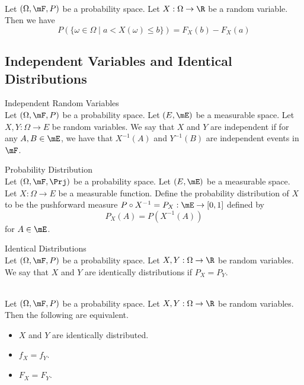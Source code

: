 \documentclass[a4paper]{article}
\begin{document}
\begin{prp}{}{}\\
Let $(\Omega,\mF,P)$ be a probability space. Let $X:\Omega\to\R$ be a random variable. Then we have $$P(\{\omega\in\Omega\;|\;a<X(\omega)\leq b\})=F_X(b)-F_X(a)$$
\end{prp}

\subsection{Independent Variables and Identical Distributions}
\begin{defn}{Independent Random Variables}{}\\
Let $(\Omega,\mF,P)$ be a probability space. Let $(E,\mE)$ be a measurable space. Let $X,Y:\Omega\to E$ be random variables. We say that $X$ and $Y$ are independent if for any $A,B\in\mE$, we have that $X^{-1}(A)$ and $Y^{-1}(B)$ are independent events in $\mF$. 
\end{defn}

\begin{defn}{Probability Distribution}{}\\
Let $(\Omega,\mF,\Prj)$ be a probability space. Let $(E,\mE)$ be a measurable space. Let $X:\Omega\to E$ be a measurable function. Define the probability distribution of $X$ to be the pushforward measure $P\circ X^{-1}=P_X:\mE\to[0,1]$ defined by $$P_X(A)=P(X^{-1}(A))$$ for $A\in\mE$. 
\end{defn}

\begin{defn}{Identical Distributions}{}\\
Let $(\Omega,\mF,P)$ be a probability space. Let $X,Y:\Omega\to\R$ be random variables. We say that $X$ and $Y$ are identically distributions if $P_X=P_Y$. 
\end{defn}

\begin{lmm}{}{}\\
Let $(\Omega,\mF,P)$ be a probability space. Let $X,Y:\Omega\to\R$ be random variables. Then the following are equivalent. 
\begin{itemize}
\item $X$ and $Y$ are identically distributed. 
\item $f_X=f_Y$. 
\item $F_X=F_Y$. 
\end{itemize}
\end{lmm}
\end{document}
